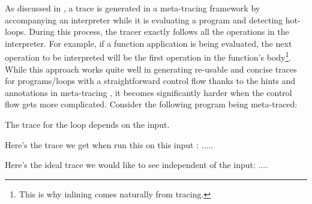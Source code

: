 As discussed in , a trace is generated in a
meta-tracing framework by accompanying an interpreter while it is
evaluating a program and detecting hot-loops. During this process, the
tracer exactly follows all the operations in the interpreter. For
example, if a function application is being evaluated, the next
operation to be interpreted will be the first operation in the
function's body\footnote{This is why inlining comes naturally from
  tracing.}. While this approach works quite well in generating
re-usable and concise traces for programs/loops with a straightforward
control flow thanks to the hints and annotations in meta-tracing
\cite{bolz09}, it becomes significantly harder when the control flow
gets more complicated. Consider the following program being
meta-traced:




The trace for the loop depends on the input.

Here's the trace we get when run this on this input : .....

Here's the ideal trace we would like to see independent of the input: ....
